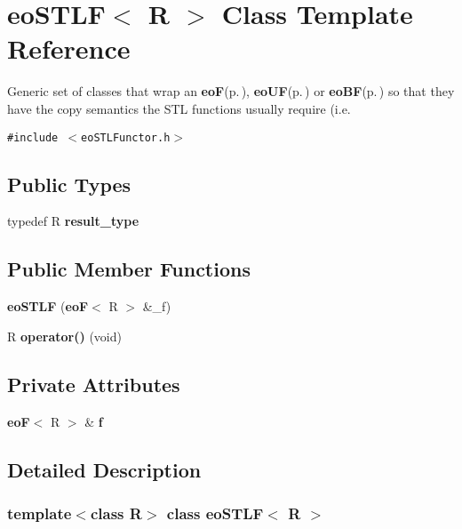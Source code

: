 \section{eo\-STLF$<$ R $>$ Class Template Reference}
\label{classeo_s_t_l_f}
Generic set of classes that wrap an {\bf eo\-F}{\rm (p.\,\pageref{classeo_f})}, {\bf eo\-UF}{\rm (p.\,\pageref{classeo_u_f})} or {\bf eo\-BF}{\rm (p.\,\pageref{classeo_b_f})} so that they have the copy semantics the STL functions usually require (i.e.  


{\tt \#include $<$eo\-STLFunctor.h$>$}

\subsection*{Public Types}
\begin{CompactItemize}
\item 
typedef R {\bf result\_\-type}\label{classeo_s_t_l_f_w0}

\end{CompactItemize}
\subsection*{Public Member Functions}
\begin{CompactItemize}
\item 
{\bf eo\-STLF} ({\bf eo\-F}$<$ R $>$ \&\_\-f)\label{classeo_s_t_l_f_a0}

\item 
R {\bf operator()} (void)\label{classeo_s_t_l_f_a1}

\end{CompactItemize}
\subsection*{Private Attributes}
\begin{CompactItemize}
\item 
{\bf eo\-F}$<$ R $>$ \& {\bf f}\label{classeo_s_t_l_f_r0}

\end{CompactItemize}


\subsection{Detailed Description}
\subsubsection*{template$<$class R$>$ class eo\-STLF$<$ R $>$}

